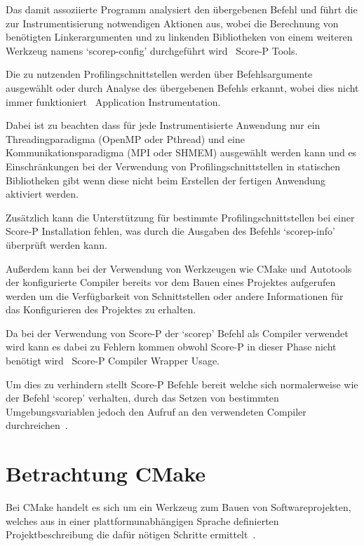 \documentclass[german,proseminar,hyperref,utf8]{zihpub}
\begin{document}
    Das damit assoziierte Programm analysiert den übergebenen Befehl und führt die zur Instrumentisierung
    notwendigen Aktionen aus, wobei die Berechnung von benötigten Linkerargumenten und zu linkenden
    Bibliotheken von einem weiteren Werkzeug namens `scorep-config' durchgeführt wird~
    {Score-P Tools}.

    Die zu nutzenden Profilingschnittstellen werden über Befehlsargumente ausgewählt oder durch
    Analyse des übergebenen Befehls erkannt, wobei dies nicht immer funktioniert~
    {Application Instrumentation}.

    Dabei ist zu beachten dass für jede Instrumentisierte Anwendung nur ein Threadingparadigma
    (OpenMP oder Pthread) und eine Kommunikationsparadigma (MPI oder SHMEM) ausgewählt werden kann
    und es Einschränkungen bei der Verwendung von Profilingschnittstellen in statischen
    Bibliotheken gibt wenn diese nicht beim Erstellen der fertigen Anwendung aktiviert werden.

    Zusätzlich kann die Unterstützung für bestimmte Profilingschnittstellen bei einer Score-P
    Installation fehlen, was durch die Ausgaben des Befehls `scorep-info' überprüft werden kann.

    Au{\ss}erdem kann bei der Verwendung von Werkzeugen wie CMake und Autotools der konfigurierte Compiler
    bereits vor dem Bauen eines Projektes aufgerufen werden um die Verfügbarkeit von Schnittstellen
    oder andere Informationen für das Konfigurieren des Projektes zu erhalten.

    Da bei der Verwendung von Score-P der `scorep' Befehl als Compiler verwendet wird kann es dabei
    zu Fehlern kommen obwohl Score-P in dieser Phase nicht benötigt wird~
    {Score-P Compiler Wrapper Usage}.

    Um dies zu verhindern stellt Score-P Befehle bereit welche sich normalerweise wie der Befehl
    `scorep' verhalten, durch das Setzen von bestimmten Umgebungsvariablen jedoch den Aufruf an den
    verwendeten Compiler durchreichen~.

    \newpage
    \section{Betrachtung CMake}
    Bei CMake handelt es sich um ein Werkzeug zum Bauen von Softwareprojekten, welches aus in einer
    plattformunabhängigen Sprache definierten Projektbeschreibung die dafür nötigen Schritte
    ermittelt~.
\end{document}
